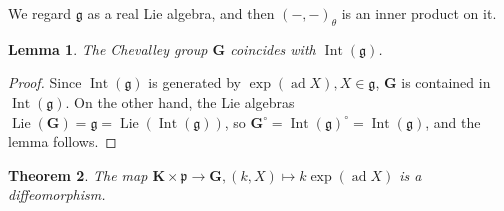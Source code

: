 \documentclass[10pt,a4paper]{amsart}
\newtheorem{theorem}{Theorem}[section]
\newtheorem{lemma}[theorem]{Lemma}
\begin{document}
We regard $\mathfrak{g}$ as a real Lie algebra, and then $(-,-)_{\theta}$ is an inner product on it.

\begin{lemma}
    The Chevalley group $\mathbf{G}$ coincides with $\operatorname{Int}(\mathfrak{g})$.
\end{lemma}

\begin{proof}
    Since $\operatorname{Int}(\mathfrak{g})$ is generated by $\operatorname{exp}(\operatorname{ad}X), X\in \mathfrak{g}$, $\mathbf{G}$ is contained in $\operatorname{Int}(\mathfrak{g})$.
    On the other hand, the Lie algebras $\operatorname{Lie}(\mathbf{G})=\mathfrak{g}=\operatorname{Lie}(\operatorname{Int}(\mathfrak{g}))$, so $\mathbf{G}^{\circ}=\operatorname{Int}(\mathfrak{g})^{\circ}=\operatorname{Int}(\mathfrak{g})$, and the lemma follows.
\end{proof}

\begin{theorem}
    The map $\mathbf{K}\times \mathfrak{p}\rightarrow \mathbf{G}, (k,X)\mapsto k\operatorname{exp}(\operatorname{ad}X)$ is a diffeomorphism.
\end{theorem}
\end{document}
